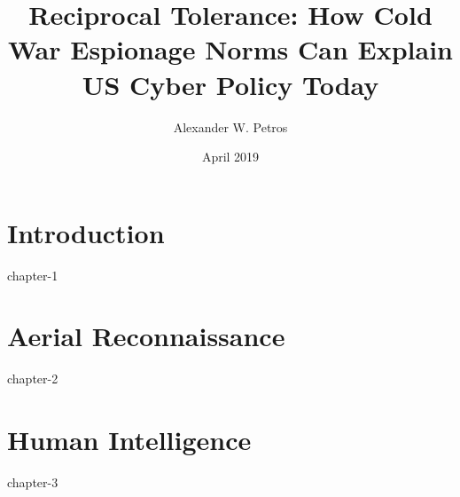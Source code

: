 \documentclass{report}
\title{Reciprocal Tolerance: How Cold War Espionage Norms Can Explain US Cyber Policy Today}
\author{Alexander W. Petros}
\date{April 2019}
\begin{document}
    \maketitle
    \tableofcontents
    \newpage

    \chapter{Introduction}
    {chapter-1}

    \chapter{Aerial Reconnaissance}
    {chapter-2}

    \chapter{Human Intelligence}
    {chapter-3}
\end{document}
